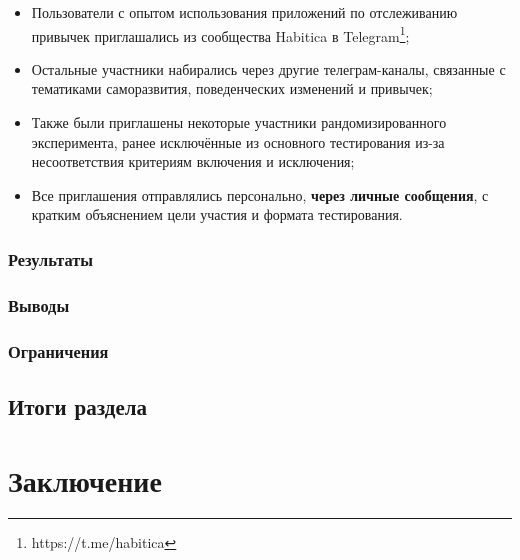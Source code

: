 \documentclass[pdflatex,sn-mathphys-num]{sn-jnl}%
\theoremstyle{thmstyleone}%
\theoremstyle{thmstyletwo}%
\theoremstyle{thmstylethree}%
\begin{document}
\begin{itemize}
\item Пользователи с опытом использования приложений по отслеживанию привычек приглашались из сообщества Habitica в Telegram\footnote{https://t.me/habitica};
\item Остальные участники набирались через другие телеграм-каналы, связанные с тематиками саморазвития, поведенческих изменений и привычек;
\item Также были приглашены некоторые участники рандомизированного эксперимента, ранее исключённые из основного тестирования из-за несоответствия критериям включения и исключения;
\item Все приглашения отправлялись персонально, \textbf{через личные сообщения}, с кратким объяснением цели участия и формата тестирования.
\end{itemize}

\subsubsection{Результаты}

\subsubsection{Выводы}

\subsubsection{Ограничения}

\subsection{Итоги раздела}

\section{Заключение}\label{sec6}

\backmatter
\end{document}
